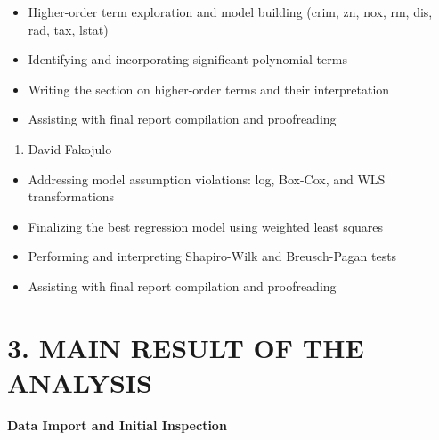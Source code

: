 \documentclass[
]{article}
\providecommand{\tightlist}{%
  \setlength{\itemsep}{0pt}\setlength{\parskip}{0pt}}
\begin{document}
\begin{itemize}
\tightlist
\item
  Higher-order term exploration and model building (crim, zn, nox, rm,
  dis, rad, tax, lstat)
\item
  Identifying and incorporating significant polynomial terms
\item
  Writing the section on higher-order terms and their interpretation
\item
  Assisting with final report compilation and proofreading
\end{itemize}

\begin{enumerate}
\def\labelenumi{\arabic{enumi}.}
\setcounter{enumi}{4}
\tightlist
\item
  David Fakojulo
\end{enumerate}

\begin{itemize}
\tightlist
\item
  Addressing model assumption violations: log, Box-Cox, and WLS
  transformations
\item
  Finalizing the best regression model using weighted least squares
\item
  Performing and interpreting Shapiro-Wilk and Breusch-Pagan tests
\item
  Assisting with final report compilation and proofreading
\end{itemize}

\section{3. MAIN RESULT OF THE
ANALYSIS}\label{main-result-of-the-analysis}

\textbf{Data Import and Initial Inspection}
\end{document}

